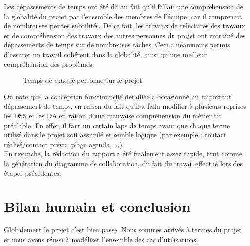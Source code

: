 Les dépassements de temps ont été dû au fait qu'il fallait une compréhension de la globalité du projet par l'ensemble des membres de l'équipe, car il comprenait de nombreuses petites subtilités. De ce fait, les travaux de relectures des travaux et de compréhension des travaux des autres personnes du projet ont entraîné des dépassements de temps sur de nombreuses tâches. Ceci a néanmoins permis d'assurer un travail cohérent dans la globalité, ainsi qu'une meilleur compréhension des problèmes.\\



\begin{figure}[H]
\noindent{}
\caption{Temps de chaque personne sur le projet}
\end{figure}


On note que la conception fonctionnelle détaillée a occasionné un important dépassement de temps, en raison du fait qu'il a fallu modifier à plusieurs reprises les DSS et les DA en raison d'une mauvaise compréhension du métier au préalable. En effet, il faut un certain laps de temps avant que chaque terme utilisé dans le projet soit assimilé et semble logique (par exemple : contact réalisé/contact prévu, plage agenda, ...).\\

En revanche, la rédaction du rapport a été finalement assez rapide, tout comme la génération du diagramme de collaboration, du fait du travail effectué lors des étapes précédentes.

\section*{Bilan humain et conclusion}
Globalement le projet c’est bien passé. Nous sommes arrivés à termes du projet et nous avons réussi à modéliser l'ensemble des cas d'utilisations.\\

